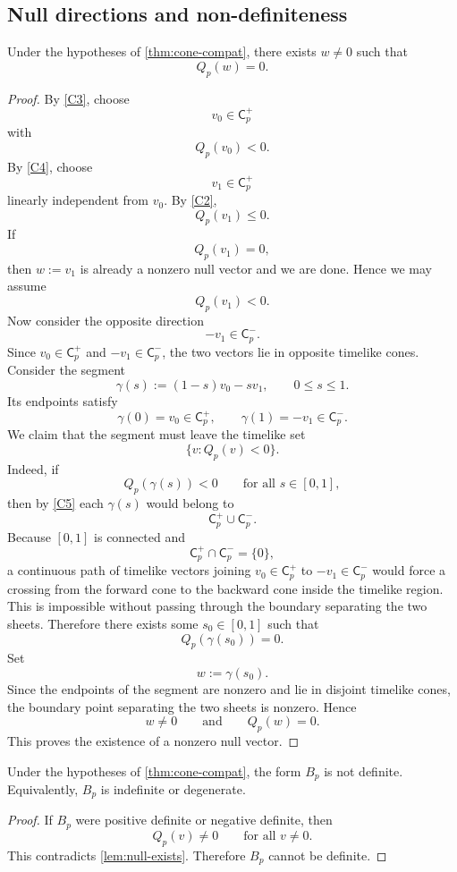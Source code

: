 \subsection{Null directions and non-definiteness}
\begin{lemma}
	\label{lem:null-exists}
	Under the hypotheses of \cref{thm:cone-compat}, there exists
	\(w\neq 0\) such that
	\[
		Q_p(w)=0.
	\]
\end{lemma}
\begin{proof}
	By \textup{\ref{C3}}, choose
	\[
		v_0\in \mathsf C_p^+
	\]
	with
	\[
		Q_p(v_0)<0.
	\]
	By \textup{\ref{C4}}, choose
	\[
		v_1\in \mathsf C_p^+
	\]
	linearly independent from \(v_0\).  By \textup{\ref{C2}},
	\[
		Q_p(v_1)\le 0.
	\]
	If
	\[
		Q_p(v_1)=0,
	\]
	then \(w:=v_1\) is already a nonzero null vector and we are done.
	Hence we may assume
	\[
		Q_p(v_1)<0.
	\]
	Now consider the opposite direction
	\[
		-v_1\in \mathsf C_p^-.
	\]
	Since \(v_0\in \mathsf C_p^+\) and \(-v_1\in \mathsf C_p^-\), the two
	vectors lie in opposite timelike cones.  Consider the segment
	\[
		\gamma(s):=(1-s)v_0-sv_1,
		\qquad 0\le s\le 1.
	\]
	Its endpoints satisfy
	\[
		\gamma(0)=v_0\in\mathsf C_p^+,
		\qquad
		\gamma(1)=-v_1\in\mathsf C_p^-.
	\]
	We claim that the segment must leave the timelike set
	\[
		\{v:Q_p(v)<0\}.
	\]
	Indeed, if
	\[
		Q_p(\gamma(s))<0
		\qquad
		\text{for all }s\in[0,1],
	\]
	then by \textup{\ref{C5}} each \(\gamma(s)\) would belong to
	\[
		\mathsf C_p^+\cup\mathsf C_p^-.
	\]
	Because \([0,1]\) is connected and
	\[
		\mathsf C_p^+\cap \mathsf C_p^-=\{0\},
	\]
	a continuous path of timelike vectors joining \(v_0\in\mathsf C_p^+\)
	to \(-v_1\in\mathsf C_p^-\) would force a crossing from the forward cone
	to the backward cone inside the timelike region.  This is impossible
	without passing through the boundary separating the two sheets.
	Therefore there exists some \(s_0\in[0,1]\) such that
	\[
		Q_p(\gamma(s_0))=0.
	\]
	Set
	\[
		w:=\gamma(s_0).
	\]
	Since the endpoints of the segment are nonzero and lie in disjoint
	timelike cones, the boundary point separating the two sheets is
	nonzero.  Hence
	\[
		w\neq 0
		\qquad\text{and}\qquad
		Q_p(w)=0.
	\]
	This proves the existence of a nonzero null vector.
\end{proof}
\begin{proposition}
	\label{prop:non-definite}
	Under the hypotheses of \cref{thm:cone-compat}, the form \(B_p\) is not
	definite.  Equivalently, \(B_p\) is indefinite or degenerate.
\end{proposition}
\begin{proof}
	If \(B_p\) were positive definite or negative definite, then
	\[
		Q_p(v)\neq 0
		\qquad
		\text{for all }v\neq 0.
	\]
	This contradicts \cref{lem:null-exists}.  Therefore \(B_p\) cannot be
	definite.
\end{proof}
